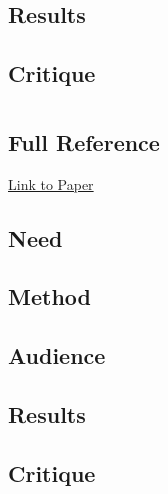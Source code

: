 \documentclass[
	letterpaper, %
]{jdf}
\begin{document}
\subsection{Results}

\subsection{Critique}

\section{\cite{shortestpathrepetitionscheduling}}
\subsection{Full Reference}

\href{https://dl.acm.org/doi/pdf/10.1145/3534678.3539081}{Link to Paper}

\subsection{Need}

\subsection{Method}

\subsection{Audience}

\subsection{Results}

\subsection{Critique}

\printbibliography{}
\end{document}
